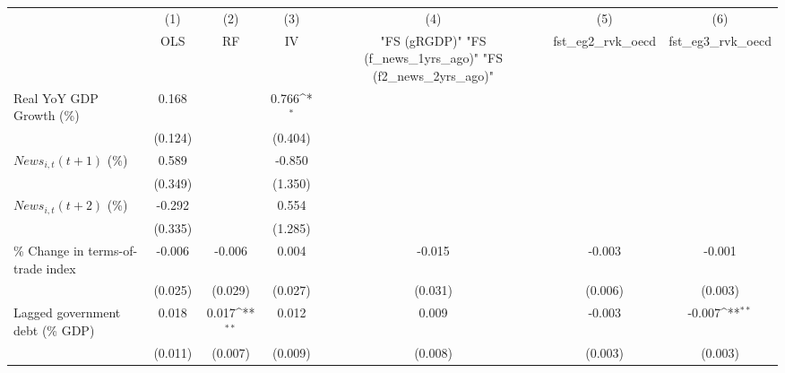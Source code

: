 {
\def\sym#1{\ifmmode^{#1}\else\(^{#1}\)\fi}
\begin{tabular}{l*{6}{c}}
\toprule
                    &\multicolumn{1}{c}{(1)}&\multicolumn{1}{c}{(2)}&\multicolumn{1}{c}{(3)}&\multicolumn{1}{c}{(4)}&\multicolumn{1}{c}{(5)}&\multicolumn{1}{c}{(6)}\\
                    &\multicolumn{1}{c}{OLS}&\multicolumn{1}{c}{RF}&\multicolumn{1}{c}{IV}&\multicolumn{1}{c}{ "FS (gRGDP)"  "FS (f_news_1yrs_ago)"  "FS (f2_news_2yrs_ago)" }&\multicolumn{1}{c}{fst_eg2_rvk_oecd}&\multicolumn{1}{c}{fst_eg3_rvk_oecd}\\
\midrule
Real YoY GDP Growth (\%)&       0.168         &                     &       0.766\sym{*}  &                     &                     &                     \\
                    &     (0.124)         &                     &     (0.404)         &                     &                     &                     \\
\addlinespace
$ News_{i,t}(t+1)$ (\%)&       0.589         &                     &      -0.850         &                     &                     &                     \\
                    &     (0.349)         &                     &     (1.350)         &                     &                     &                     \\
\addlinespace
$ News_{i,t}(t+2)$ (\%)&      -0.292         &                     &       0.554         &                     &                     &                     \\
                    &     (0.335)         &                     &     (1.285)         &                     &                     &                     \\
\addlinespace
\% Change in terms-of-trade index&      -0.006         &      -0.006         &       0.004         &      -0.015         &      -0.003         &      -0.001         \\
                    &     (0.025)         &     (0.029)         &     (0.027)         &     (0.031)         &     (0.006)         &     (0.003)         \\
\addlinespace
Lagged government debt (\% GDP)&       0.018         &       0.017\sym{**} &       0.012         &       0.009         &      -0.003         &      -0.007\sym{**} \\
                    &     (0.011)         &     (0.007)         &     (0.009)         &     (0.008)         &     (0.003)         &     (0.003)         \\

\end{tabular}}
